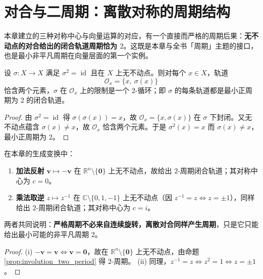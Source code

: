 \section{对合与二周期：离散对称的周期结构}
\label{sec:involution_two_period}

本章建立的三种对称中心与向量运算的对应，有一个直接而严格的周期后果：\textbf{无不动点的对合给出的闭合轨道周期恰为 $2$}。这既是本章与全书「周期」主题的接口，也是最小非平凡周期在向量层面的第一个实例。

\begin{proposition}\label{prop:involution_two_period}
设 $\sigma:X\to X$ 满足 $\sigma^2=\operatorname{id}$ 且在 $X$ 上无不动点。则对每个 $x\in X$，轨道
\[
\mathcal{O}_x=\{x,\ \sigma(x)\}
\]
恰含两个元素，$\sigma$ 在 $\mathcal{O}_x$ 上的限制是一个 $2$-循环；即 $\sigma$ 的每条轨道都是最小正周期为 $2$ 的闭合轨道。
\end{proposition}

\begin{proof}
由 $\sigma^2=\operatorname{id}$ 得 $\sigma(\sigma(x))=x$，故 $\mathcal{O}_x=\{x,\sigma(x)\}$ 在 $\sigma$ 下封闭。又无不动点蕴含 $\sigma(x)\neq x$，故 $\mathcal{O}_x$ 恰含两个元素。于是 $\sigma^2(x)=x$ 而 $\sigma(x)\neq x$，最小正周期为 $2$。
\end{proof}

\begin{corollary}[本章两种对称中心都给出 2-周期]\label{cor:reflection_two_period}
在本章的生成变换中：
\begin{enumerate}[label=(\roman*)]
    \item \textbf{加法反射} $\mathbf{v}\mapsto-\mathbf{v}$ 在 $\mathbb{R}^n\setminus\{\mathbf{0}\}$ 上无不动点，故给出 $2$-周期闭合轨道；其对称中心为 $c=0$。
    \item \textbf{乘法取逆} $z\mapsto z^{-1}$ 在 $\mathbb{C}\setminus\{0,1,-1\}$ 上无不动点（因 $z^{-1}=z\iff z=\pm1$），同样给出 $2$-周期闭合轨道；其对称中心为 $c=i$。
\end{enumerate}
两者共同说明：\textbf{严格周期不必来自连续旋转，离散对合同样产生周期}，只是它只能给出最小可能的非平凡周期 $2$。
\end{corollary}

\begin{proof}
(i) $-\mathbf{v}=\mathbf{v}\iff\mathbf{v}=\mathbf{0}$，故在 $\mathbb{R}^n\setminus\{\mathbf{0}\}$ 上无不动点，由命题 \ref{prop:involution_two_period} 得 $2$-周期。
(ii) 同理，$z^{-1}=z\iff z^2=1\iff z=\pm1$。
\end{proof}

